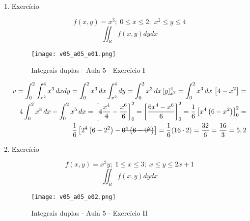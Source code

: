 \begin{enumerate}
	\item Exercício
	
	\begin{equation*}
		f(x,y) = x^3;\; 0 \leq x \leq 2;\; x^2 \leq y \leq 4	
	\end{equation*}
	\begin{equation*}
		\iint_R f(x, y) dy dx
	\end{equation*}
	
	\begin{figure}[htb]
		\caption{Integrais duplas - Aula 5 - Exercício I}
		\label{v05_a05_e01}
		\centering
		\texttt{[image: v05\_a05\_e01.png]}		
	\end{figure}
	
	\begin{align*}
		v = \int_0^2 \int_{x^2}^4 x^3\, dx dy = \int_0^2 x^3\, dx \int_{x^2}^4 dy = \int_0^2 x^3\, dx\, [y]_{x^2}^4 = \int_0^2 x^3\, dx\, \left[4 - x^2\right] =\\ 4\int_0^2 x^3\, dx - \int_0^2 x^5\, dx = \left[\overstrike{4}\dfrac{x^4}{\overstrike{4}} - \frac{x^6}{6}\right]_0^2 = \left[\dfrac{6x^4 - x^6}{6}\right]_0^2 = \frac{1}{6}\left[x^4\left(6 - x^2\right)\right]_0^2 =\\ \frac{1}{6}\left[2^4\left(6 - 2^2\right) - \overstrike{0^4\left(6 - 0^2\right)}\right] = \dfrac{1}{6}(16\cdot2) = \dfrac{32}{6} = \dfrac{16}{3} = 5,2
	\end{align*}
	
	\item Exercício
	
	\begin{equation*}
		f(x,y) = x^2y;\; 1 \leq x \leq 3;\; x \leq y \leq 2x + 1
	\end{equation*}
	\begin{equation*}
		\iint_R f(x, y) dy dx
	\end{equation*}
	
	\begin{figure}[htb]
		\caption{Integrais duplas - Aula 5 - Exercício II}
		\label{v05_a05_e02}
		\centering
		\texttt{[image: v05\_a05\_e02.png]}		
	\end{figure}
	

\end{enumerate}
